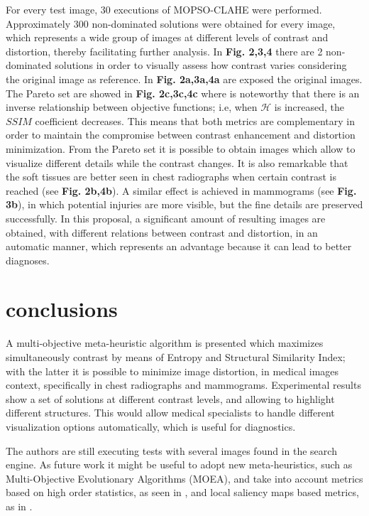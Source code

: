\documentclass[spanish,twocolumn]{article}
\begin{document}
{For every test image, 30 executions of MOPSO-CLAHE were performed. Approximately 300 non-dominated solutions were obtained for every image, which represents a wide group of images at different levels of contrast and distortion, thereby facilitating further analysis. In \textbf {Fig. 2,3,4} there are 2 non-dominated solutions in order to visually assess how contrast varies considering the original image as reference. In \textbf {Fig. 2a,3a,4a} are exposed the original images. The Pareto set are showed in \textbf {Fig. 2c,3c,4c} where is noteworthy that there is an inverse relationship between objective functions; i.e, when $\mathscr{H}$ is increased, the $SSIM$ coefficient decreases. This means that both metrics are complementary in order to maintain the compromise between contrast enhancement and distortion minimization. From the Pareto set it is possible to obtain images which allow to visualize different details while the contrast changes. It is also remarkable that the soft tissues are better seen in chest radiographs when certain contrast is reached (see \textbf {Fig. 2b,4b}). A similar effect is achieved in mammograms (see \textbf {Fig. 3b}), in which potential injuries are more visible, but the fine details are preserved successfully. In this proposal, a significant amount of resulting images are obtained, with different relations between contrast and distortion, in an automatic manner, which represents an advantage because it can lead to better diagnoses.


\section{conclusions}
\label{sec:conclusion}
A multi-objective meta-heuristic algorithm is presented which maximizes simultaneously contrast by means of Entropy and Structural Similarity Index; with the latter it is possible to minimize image distortion, in medical images context, specifically in chest radiographs and mammograms. Experimental results show a set of solutions at different contrast levels, and allowing to highlight different structures. This would allow medical specialists to handle different visualization options automatically, which is useful for diagnostics.

The authors are still executing tests with several images found in the search engine. As future work it might be useful to adopt new meta-heuristics, such as Multi-Objective Evolutionary Algorithms (MOEA)\cite{coello2002evolutionary}, and take into account metrics based on high order statistics, as seen in \cite{7056527}, and local saliency maps based metrics, as in \cite{LTG}.


}
\end{document}
